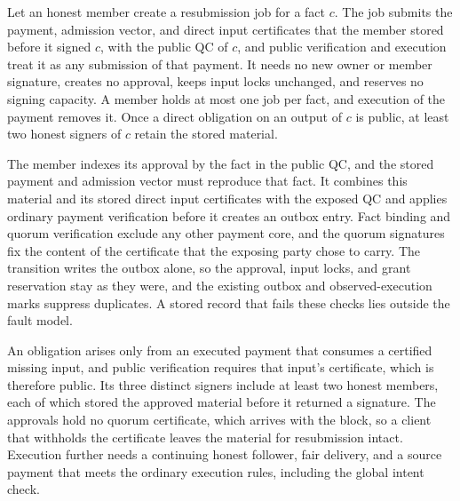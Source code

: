 \begin{lemma}
\label{lem:security-resubmission}
Let an honest member create a resubmission job for a fact $c$. The job submits the payment, admission vector, and direct input certificates that the member stored before it signed $c$, with the public QC of $c$, and public verification and execution treat it as any submission of that payment. It needs no new owner or member signature, creates no approval, keeps input locks unchanged, and reserves no signing capacity. A member holds at most one job per fact, and execution of the payment removes it. Once a direct obligation on an output of $c$ is public, at least two honest signers of $c$ retain the stored material.
\end{lemma}
\begin{IEEEproof}
The member indexes its approval by the fact in the public QC, and the stored payment and admission vector must reproduce that fact. It combines this material and its stored direct input certificates with the exposed QC and applies ordinary payment verification before it creates an outbox entry. Fact binding and quorum verification exclude any other payment core, and the quorum signatures fix the content of the certificate that the exposing party chose to carry. The transition writes the outbox alone, so the approval, input locks, and grant reservation stay as they were, and the existing outbox and observed-execution marks suppress duplicates. A stored record that fails these checks lies outside the fault model.

An obligation arises only from an executed payment that consumes a certified missing input, and public verification requires that input's certificate, which is therefore public. Its three distinct signers include at least two honest members, each of which stored the approved material before it returned a signature. The approvals hold no quorum certificate, which arrives with the block, so a client that withholds the certificate leaves the material for resubmission intact. Execution further needs a continuing honest follower, fair delivery, and a source payment that meets the ordinary execution rules, including the global intent check.
\end{IEEEproof}

